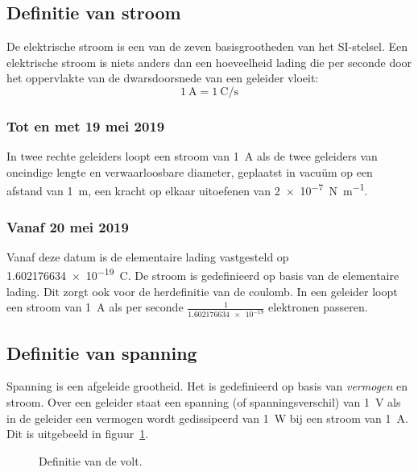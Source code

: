 \subsection{Definitie van stroom}
De elektrische stroom is een van de zeven basisgrootheden van het SI-stelsel. Een elektrische stroom is niets anders dan een hoeveelheid lading die per seconde door het oppervlakte van de dwarsdoorsnede van een geleider vloeit:
%
\begin{equation}
\SI{1}{\ampere} = \SI[per-mode=fraction]{1}{\coulomb\per\second}
\end{equation} 

\subsubsection*{Tot en met 19 mei 2019}
In twee rechte geleiders loopt een stroom van \SI{1}{\ampere} als de twee geleiders van oneindige lengte en verwaarloosbare diameter, geplaatst in vacuüm op een afstand van \SI{1}{\meter}, een kracht op elkaar uitoefenen van \SI[per-mode=symbol]{2e-7}{\newton\per\meter}.

\subsubsection*{Vanaf 20 mei 2019}
Vanaf deze datum is de elementaire lading vastgesteld op \SI{1.602176634e-19}{\coulomb}. De stroom is gedefinieerd op basis van de elementaire lading. Dit zorgt ook voor de herdefinitie van de coulomb. In een geleider loopt een stroom van \SI{1}{\ampere} als per seconde $\frac{1}{\num{1.602176634e-19}}$ elektronen passeren.

\subsection{Definitie van spanning}
Spanning is een afgeleide grootheid. Het is gedefinieerd op basis van \textsl{vermogen} en stroom. Over een geleider staat een spanning (of spanningsverschil) van \SI{1}{\volt} als in de geleider een vermogen wordt gedissipeerd van \SI{1}{\watt} bij een stroom van \SI{1}{\ampere}. Dit is uitgebeeld in figuur~\ref{fig:intdefinitievolt}.

\begin{figure}[!ht]
\centering
{}
\caption{Definitie van de volt.}
\label{fig:intdefinitievolt}
\end{figure}

